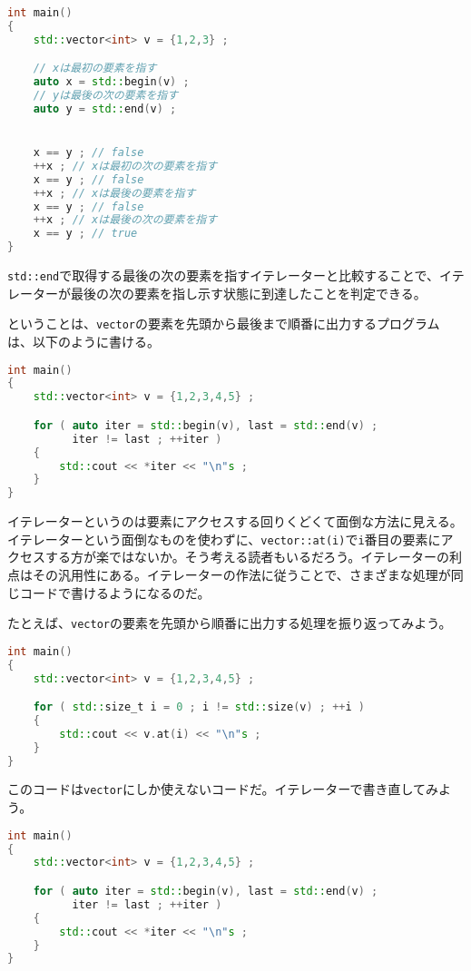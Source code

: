 \begin{lstlisting}[language={C++}]
int main()
{
    std::vector<int> v = {1,2,3} ;

    // xは最初の要素を指す
    auto x = std::begin(v) ;
    // yは最後の次の要素を指す
    auto y = std::end(v) ;


    x == y ; // false
    ++x ; // xは最初の次の要素を指す
    x == y ; // false
    ++x ; // xは最後の要素を指す
    x == y ; // false
    ++x ; // xは最後の次の要素を指す
    x == y ; // true
}
\end{lstlisting}

\texttt{std::end}で取得する最後の次の要素を指すイテレーターと比較することで、イテレーターが最後の次の要素を指し示す状態に到達したことを判定できる。

ということは、\texttt{vector}の要素を先頭から最後まで順番に出力するプログラムは、以下のように書ける。

\begin{lstlisting}[language={C++}]
int main()
{
    std::vector<int> v = {1,2,3,4,5} ;

    for ( auto iter = std::begin(v), last = std::end(v) ;
          iter != last ; ++iter )
    {
        std::cout << *iter << "\n"s ;
    }
}
\end{lstlisting}


イテレーターというのは要素にアクセスする回りくどくて面倒な方法に見える。イテレーターという面倒なものを使わずに、\texttt{vector::at(i)}で\texttt{i}番目の要素にアクセスする方が楽ではないか。そう考える読者もいるだろう。イテレーターの利点はその汎用性にある。イテレーターの作法に従うことで、さまざまな処理が同じコードで書けるようになるのだ。

たとえば、\texttt{vector}の要素を先頭から順番に出力する処理を振り返ってみよう。

\begin{lstlisting}[language={C++}]
int main()
{
    std::vector<int> v = {1,2,3,4,5} ;

    for ( std::size_t i = 0 ; i != std::size(v) ; ++i )
    {
        std::cout << v.at(i) << "\n"s ;
    }
}
\end{lstlisting}

このコードは\texttt{vector}にしか使えないコードだ。イテレーターで書き直してみよう。

\begin{lstlisting}[language={C++}]
int main()
{
    std::vector<int> v = {1,2,3,4,5} ;

    for ( auto iter = std::begin(v), last = std::end(v) ;
          iter != last ; ++iter )
    {
        std::cout << *iter << "\n"s ;
    }
}
\end{lstlisting}

